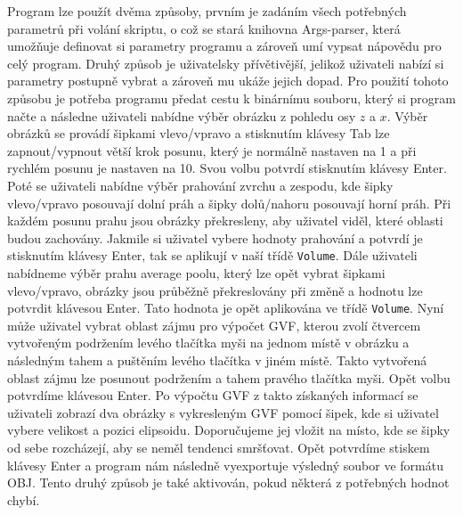Program lze použít dvěma způsoby, prvním je zadáním všech potřebných parametrů při volání skriptu, o což se stará knihovna Args-parser, která umožňuje definovat si parametry programu a zároveň umí vypsat nápovědu pro celý program. Druhý způsob je uživatelsky přívětivější, jelikož uživateli nabízí si parametry postupně vybrat a zároveň mu ukáže jejich dopad. Pro použití tohoto způsobu je potřeba programu předat cestu k binárnímu souboru, který si program načte a následne uživateli nabídne výběr obrázku z pohledu osy $z$ a $x$. Výběr obrázků se provádí šipkami vlevo/vpravo a stisknutím klávesy Tab lze zapnout/vypnout větší krok posunu, který je normálně nastaven na 1 a při rychlém posunu je nastaven na 10. Svou volbu potvrdí stisknutím klávesy Enter. Poté se uživateli nabídne výběr prahování zvrchu a zespodu, kde šipky vlevo/vpravo posouvají dolní práh a šipky dolů/nahoru posouvají horní práh. Při každém posunu prahu jsou obrázky překresleny, aby uživatel viděl, které oblasti budou zachovány. Jakmile si uživatel vybere hodnoty prahování a potvrdí je stisknutím klávesy Enter, tak se aplikují v naší třídě \verb|Volume|. Dále uživateli nabídneme výběr prahu average poolu, který lze opět vybrat šipkami vlevo/vpravo, obrázky jsou průběžně překreslovány při změně a hodnotu lze potvrdit klávesou Enter. Tato hodnota je opět aplikována ve třídě \verb|Volume|. Nyní může uživatel vybrat oblast zájmu pro výpočet GVF, kterou zvolí čtvercem vytvořeným podržením levého tlačítka myši na jednom místě v obrázku a následným tahem a puštěním levého tlačítka v jiném místě. Takto vytvořená oblast zájmu lze posunout podržením a tahem pravého tlačítka myši. Opět volbu potvrdíme klávesou Enter. Po výpočtu GVF z takto získaných informací se uživateli zobrazí dva obrázky s vykresleným GVF pomocí šipek, kde si uživatel vybere velikost a pozici elipsoidu. Doporučujeme jej vložit na místo, kde se šipky od sebe rozcházejí, aby se neměl tendenci smršťovat. Opět potvrdíme stiskem klávesy Enter a program nám následně vyexportuje výsledný soubor ve formátu OBJ. Tento druhý způsob je také aktivován, pokud některá z potřebných hodnot chybí.

\endinput
